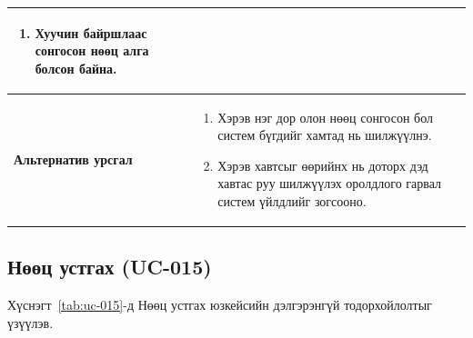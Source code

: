 \begin{table}[H]
\begin{tabular}{|p{3.8cm}|p{10.2cm}|}
\begin{enumerate}
            \item Хуучин байршлаас сонгосон нөөц алга болсон байна.
        \end{enumerate}
        \\ \hline
        \textbf{Альтернатив урсгал} &
        \begin{enumerate}
            \item Хэрэв нэг дор олон нөөц сонгосон бол систем бүгдийг хамтад нь шилжүүлнэ.
            \item Хэрэв хавтсыг өөрийнх нь доторх дэд хавтас руу шилжүүлэх оролдлого гарвал систем үйлдлийг зогсооно.
        \end{enumerate}
        \\ \hline
    \end{tabular}
\end{table}

\subsection{Нөөц устгах (UC-015)}

Хүснэгт~\ref{tab:uc-015}-д Нөөц устгах юзкейсийн дэлгэрэнгүй тодорхойлолтыг үзүүлэв.

